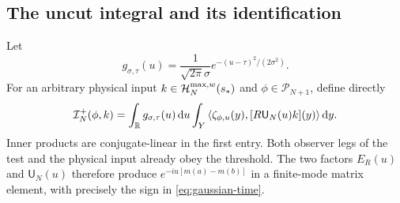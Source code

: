 \subsection{The uncut integral and its identification}
Let
\begin{equation}
 g_{\sigma,\tau}(u)=
 \frac{1}{\sqrt{2\pi}\sigma}e^{-(u-\tau)^2/(2\sigma^2)}.
\end{equation}
For an arbitrary physical input $k\in\mathcal H_N^{\max,w}(s_*)$ and
$\phi\in\mathcal P_{N+1}$, define directly
\begin{equation}
 \mathcal I_N^+(\phi,k)=
 \int_{\mathbb R}g_{\sigma,\tau}(u)\mathop{}\!\mathrm d u
 \int_Y
 \left\langle\zeta_{\phi,u}(y),[R\mathsf U_N(u)k](y)\right\rangle\mathop{}\!\mathrm d y.
 \label{eq:direct-position-creation}
\end{equation}
Inner products are conjugate-linear in the first entry. Both observer
legs of the test and the physical input already obey the threshold.
The two factors $E_R(u)$ and $\mathsf U_N(u)$ therefore produce
$e^{-iu[m(a)-m(b)]}$ in a finite-mode matrix element, with precisely
the sign in \eqref{eq:gaussian-time}.


